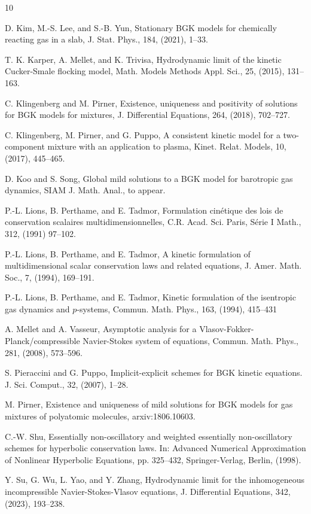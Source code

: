 \documentclass[10pt,reqno]{amsart}
\numberwithin{equation}{section}
\begin{document}
\begin{thebibliography}{10}
 
	
  D. Kim, M.-S. Lee, and S.-B. Yun,  Stationary BGK models for chemically reacting gas in a slab, J. Stat. Phys., 184, (2021), 1--33.
	
 

 T. K. Karper, A. Mellet, and K. Trivisa, Hydrodynamic limit of the kinetic Cucker-Smale flocking model, Math. Models Methods Appl. Sci., 25, (2015), 131--163.


 
	 C. Klingenberg and  M. Pirner, Existence, uniqueness and positivity of solutions for BGK models for mixtures, J. Differential Equations, 264, (2018), 702--727.

C. Klingenberg, M. Pirner, and G. Puppo, A consistent kinetic model for a two-component mixture with an application to plasma, Kinet. Relat. Models, 10, (2017), 445--465. 


 
 D. Koo and S. Song, Global mild solutions to a BGK model for barotropic gas dynamics, SIAM J. Math. Anal., to appear. 


 P.-L. Lions, B. Perthame, and E. Tadmor, Formulation cin\'{e}tique des lois de conservation scalaires multidimensionnelles,
C.R. Acad. Sci. Paris, S\'{e}rie I Math., 312,  (1991) 97--102.


 P.-L. Lions, B. Perthame, and E. Tadmor, A kinetic formulation of multidimensional scalar conservation laws and related equations, J. Amer. Math. Soc., 7, (1994), 169--191.

 P.-L. Lions, B. Perthame, and E. Tadmor, Kinetic formulation of the isentropic gas dynamics and $p$-systems, Commun. Math. Phys., 163, (1994), 415--431

 
 A. Mellet and A. Vasseur, Asymptotic analysis for a Vlasov-Fokker-Planck/compressible Navier-Stokes system of equations, Commun. Math. Phys., 281, (2008), 573--596.

 S. Pieraccini and G. Puppo, Implicit-explicit schemes for BGK kinetic equations. J. Sci. Comput., 32, (2007), 1--28. 	

 M. Pirner,  Existence and uniqueness of mild solutions for BGK models for gas mixtures of polyatomic molecules, arxiv:1806.10603.

 C.-W. Shu, Essentially non-oscillatory and weighted essentially non-oscillatory schemes for hyperbolic conservation laws. In: Advanced Numerical Approximation of Nonlinear Hyperbolic Equations, pp. 325--432, Springer-Verlag, Berlin, (1998).


 Y. Su, G. Wu, L. Yao, and Y. Zhang, Hydrodynamic limit for the inhomogeneous incompressible Navier-Stokes-Vlasov equations, J. Differential Equations, 342, (2023), 193--238.














\end{thebibliography}
\end{document}
